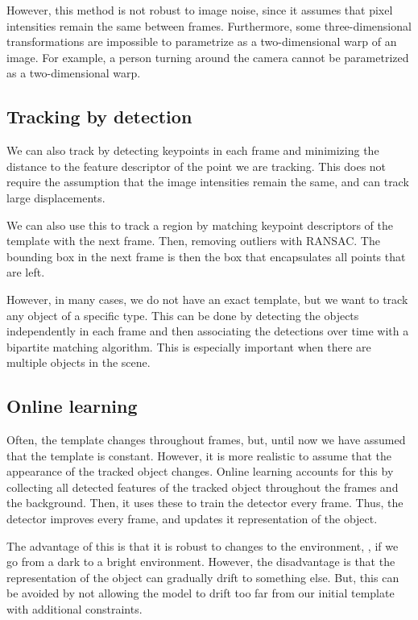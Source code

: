 However, this method is not robust to image noise, since it assumes that pixel
intensities remain the same between frames. Furthermore, some three-dimensional
transformations are impossible to parametrize as a two-dimensional warp of an
image. For example, a person turning around \wrt the camera cannot be
parametrized as a two-dimensional warp.

\subsection{Tracking by detection}

We can also track by detecting keypoints in each frame and minimizing the
distance to the feature descriptor of the point we are tracking. This does not
require the assumption that the image intensities remain the same, and can
track large displacements.

We can also use this to track a region by matching keypoint descriptors of
the template with the next frame. Then, removing outliers with \eg RANSAC.
The bounding box in the next frame is then the box that encapsulates all
points that are left.

However, in many cases, we do not have an exact template, but we want to
track any object of a specific type. This can be done by detecting the objects
independently in each frame and then associating the detections over time
with a bipartite matching algorithm. This is especially important
when there are multiple objects in the scene.

\subsection{Online learning}

Often, the template changes throughout frames, but, until now we have assumed
that the template is constant. However, it is more realistic to assume that the
appearance of the tracked object changes. Online learning accounts for this by
collecting all detected features of the tracked object throughout the frames
and the background. Then, it uses these to train the detector every frame.
Thus, the detector improves every frame, and updates it representation of the
object.

The advantage of this is that it is robust to changes to the environment, \eg,
if we go from a dark to a bright environment. However, the disadvantage is that
the representation of the object can gradually drift to something else. But,
this can be avoided by not allowing the model to drift too far from our
initial template with additional constraints.
